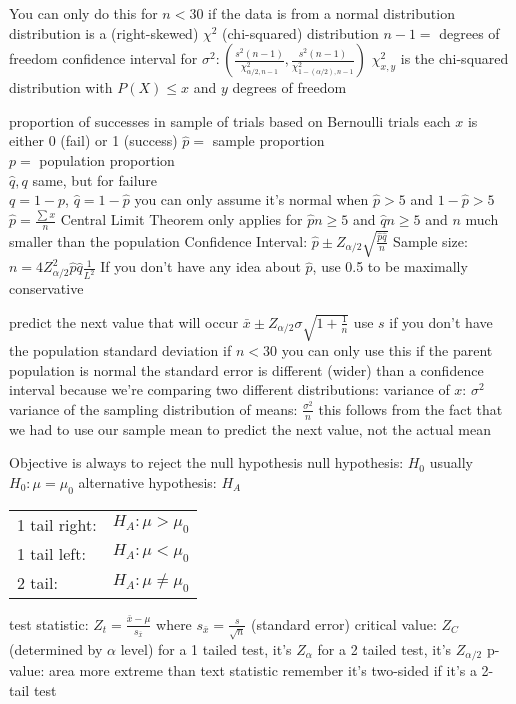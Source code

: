 \documentclass{article}
\begin{document}
\begin{multicols*}{2}
\begin{outline}[compactitem]
  \1 You can only do this for $n<30$ if the data is from a normal distribution
  \1 distribution is a (right-skewed) $\chi^2$ (chi-squared) distribution
  \1 $n-1=$ degrees of freedom
  \1 confidence interval for $\sigma^2: \left(
      \frac{s^2(n-1)}{\chi^2_{\alpha/2, n-1}}, 
      \frac{s^2(n-1)}{\chi^2_{1-(\alpha/2), n-1}} 
    \right)$
    \2 $\chi^2_{x, y}$ is the chi-squared distribution with $P(X)\leq x$ and $y$ degrees of freedom

  \1 proportion of successes in sample of trials
  \1 based on Bernoulli trials
    \2 each $x$ is either 0 (fail) or 1 (success)
  \1 $\hat{p} = $ sample proportion
    \\ $p=$ population proportion
    \\ $\hat{q}, q$ same, but for failure
    \\ $q=1-p$,  $\hat{q}=1-\hat{p}$
  \1 you can only assume it's normal when $\hat{p}>5$ and $1-\hat{p}>5$
  \1 $\hat{p} = \frac{\sum x}{n}$
  \1 Central Limit Theorem only applies for $\hat{p}n\geq5$ and $\hat{q}n\geq5$ and $n$ much smaller than the population
  \1 Confidence Interval:
    $\hat{p} \pm Z_{\alpha/2}\sqrt{\frac{\hat{p}\hat{q}}{n}}$
  \1 Sample size:
    $n = 4Z^2_{\alpha/2}\hat{p}\hat{q}\frac{1}{L^2}$
    \2 If you don't have any idea about $\hat{p}$, use 0.5 to be maximally conservative

  \1 predict the next value that will occur
  \1 $\bar{x} \pm Z_{\alpha/2}\sigma\sqrt{1+\frac{1}{n}}$
    \2 use $s$ if you don't have the population standard deviation
  \1 if $n<30$ you can only use this if the parent population is normal
  \1 the standard error is different (wider) than a confidence interval because we're comparing two different distributions:
    \2 variance of $x$: $\sigma^2$
    \2 variance of the sampling distribution of means: $\frac{\sigma^2}{n}$
  \1 this follows from the fact that we had to use our sample mean to predict the next value, not the actual mean

  \1 Objective is always to reject the null hypothesis
  \1 null hypothesis: $H_0$
    \2 usually $H_0: \mu = \mu_0$
  \1 alternative hypothesis: $H_A$
    \\\begin{tabular}{l r}
      1 tail right: & $H_A: \mu     > \mu_0$ \\
      1 tail left:  & $H_A: \mu     < \mu_0$ \\
      2 tail:       & $H_A: \mu \not= \mu_0$ \\
    \end{tabular}
  \1 test statistic: $Z_t = \frac{\bar{x} - \mu}{s_\bar{x}}$ where $s_\bar{x} = \frac{s}{\sqrt{n}}$ (standard error)
  \1 critical value: $Z_C$ (determined by $\alpha$ level)
    \2 for a 1 tailed test, it's $Z_\alpha$
    \2 for a 2 tailed test, it's $Z_{\alpha/2}$
  \1 p-value: area more extreme than text statistic
    \2 remember it's two-sided if it's a 2-tail test


\end{outline}
\end{multicols*}
\end{document}
